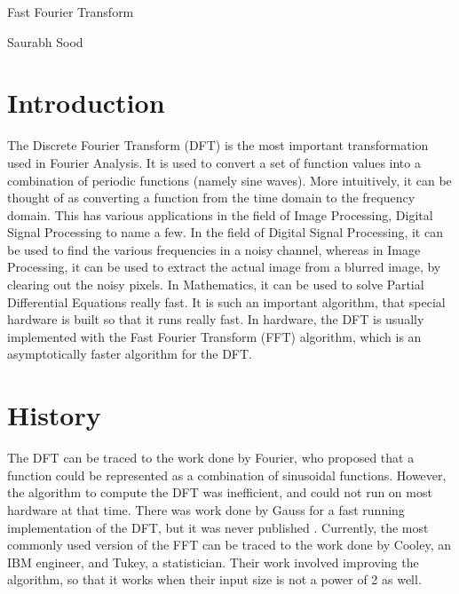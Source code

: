 \documentclass{article}
\begin{document}
\begin{center}{\LARGE Fast Fourier Transform}\end{center}
\begin{center}{\normalsize Saurabh Sood}\end{center}

\begin{abstract}
This paper presents the implementation and analysis of the Fast Fourier Transform. The Fast Fourier transform algorithm is a major asymptotic improvement over the Discrete Fourier transform, and has varied applications in the field of signal processing. The Discrete Fourier Transform (DFT) has a time complexity of $O(n^2)$, whereas the Fast Fourier Transform runs in $O(nlog_2{n})$. The paper looks at an implementation of the FFT, and provides a rigorous mathematical analysis of the time, and space complexities in the Worst, Average and Best case inputs. 
\end{abstract}

\section{Introduction}
The Discrete Fourier Transform (DFT) is the most important transformation used in Fourier Analysis. It is used to convert a set of function values into a combination of periodic functions (namely sine waves). More intuitively, it can be thought of as converting a function from the time domain to the frequency domain. This has various applications in the field of Image Processing, Digital Signal Processing to name a few. In the field of Digital Signal Processing, it can be used to find the various frequencies in a noisy channel, whereas in Image Processing, it can be used to extract the actual image from a blurred image, by clearing out the noisy pixels. In Mathematics, it can be used to solve Partial Differential Equations really fast.  It is such an important algorithm, that special hardware is built so that it runs really fast. In hardware, the DFT is usually implemented with the Fast Fourier Transform (FFT) algorithm, which is an asymptotically faster algorithm for the DFT.

\section{History}
The DFT can be traced to the work done by Fourier, who proposed that a function could be represented as a combination of sinusoidal functions. However, the algorithm to compute the DFT was inefficient, and could not run on most hardware at that time. There was work done by Gauss for a fast running implementation of the DFT, but it was never published \cite{10.2307/2003354}. Currently, the most commonly used version of the FFT can be traced to the work done by Cooley, an IBM engineer, and Tukey, a statistician. Their work involved improving the algorithm, so that it works when their input size is not a power of 2 as well.
\end{document}
